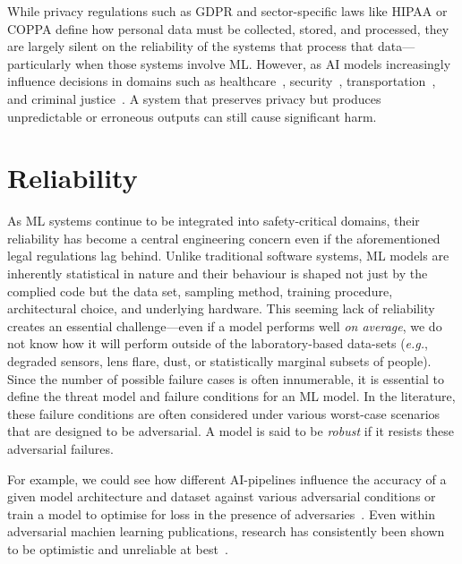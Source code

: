 While privacy regulations such as GDPR and sector-specific laws like HIPAA or COPPA define how personal data must be collected, stored, and processed, they are largely silent on the reliability of the systems that process that data---particularly when those systems involve ML\@. 
However, as AI models increasingly influence decisions in domains such as healthcare~\cite{ai_medical_imaging}, security~\cite{ai_security}, transportation~\cite{ai_automotive,ai_aviation}, and criminal justice~\cite{ai_prison}.
A system that preserves privacy but produces unpredictable or erroneous outputs can still cause significant harm.


\section{Reliability}
\label{reliability}

As ML systems continue to be integrated into safety-critical domains, their reliability has become a central engineering concern even if the aforementioned legal regulations lag behind. 
Unlike traditional software systems, ML models are inherently statistical in nature and their behaviour is shaped not just by the complied code but the data set, sampling method, training procedure, architectural choice, and underlying hardware. 
This seeming lack of reliability creates an essential challenge---even if a model performs well \textit{on average}, we do not know how it will perform outside of the laboratory-based data-sets (\textit{e.g.}, degraded sensors, lens flare, dust, or statistically marginal subsets of people). 
Since the number of possible failure cases is often innumerable, it is essential to define the threat model and failure conditions for an ML model. 
In the literature, these failure conditions are often considered under various worst-case scenarios that are designed to be adversarial. 
A model is said to be \textit{robust} if it resists these adversarial failures. 

For example, we could see how different AI-pipelines influence the accuracy of a given model architecture and dataset against various adversarial conditions or train a model to optimise for loss in the presence of adversaries~\cite{croce_reliable_2020,li2016general}. 
Even within adversarial machien learning publications, research has consistently been shown to be optimistic and unreliable at best~\cite{croce2020robustbench}. 

